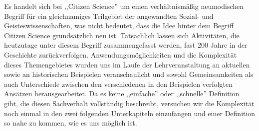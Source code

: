 \documentclass{article}
\begin{document}
Es handelt sich bei ,,Citizen Science'' um einen verhältnismäßig neumodischen Begriff
für ein gleichnamiges Teilgebiet der angewandten Sozial- und Geisteswissenschaften,
was nicht bedeutet, dass die Idee hinter dem Begriff Citizen Science grundsätzlich neu ist.
Tatsächlich lassen sich Aktivitäten, die heutzutage unter diesem Begriff zusammengefasst werden,
fast 200 Jahre in der Geschichte zurückverfolgen.
Anwendungsmöglichkeiten und die Komplexität dieses Themengebietes
wurden uns im Laufe der Lehrveranstaltung an aktuellen sowie an historischen Beispielen veranschaulicht
und sowohl Gemeinsamkeiten als auch Unterschiede zwischen den verschiedenen in den Beispielen verfolgten Ansätzen herausgearbeitet.
Da es keine ,,einfache'' oder ,,schnelle'' Definition gibt, die diesen Sachverhalt vollständig beschreibt,
versuchen wir die Komplexität noch einmal in den zwei folgenden Unterkapiteln einzufangen
und einer Definition so nahe zu kommen, wie es uns möglich ist.
\end{document}
